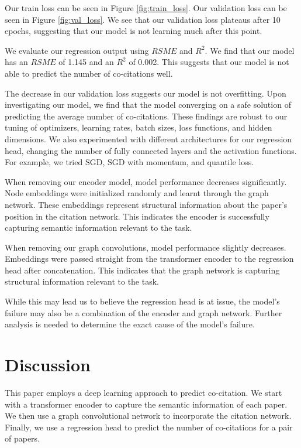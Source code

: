 \documentclass[10pt,twocolumn,letterpaper]{article}
\begin{document}
Our train loss can be seen in Figure \ref{fig:train_loss}. Our validation loss can be seen in Figure \ref{fig:val_loss}. We see that our validation loss plateaus after 10 epochs, suggesting that our model is not learning much after this point.

We evaluate our regression output using $RSME$ and $R^2$. We find that our model has an $RSME$ of 1.145 and an $R^2$ of 0.002. This suggests that our model is not able to predict the number of co-citations well. 

The decrease in our validation loss suggests our model is not overfitting. Upon investigating our model, we find that the model converging on a safe solution of predicting the average number of co-citations. These findings are robust to our tuning of optimizers, learning rates, batch sizes, loss functions, and hidden dimensions. We also experimented with different architectures for our regression head, changing the number of fully connected layers and the activation functions. For example, we tried SGD, SGD with momentum, and quantile loss.

When removing our encoder model, model performance decreases significantly. Node embeddings were initialized randomly and learnt through the graph network. These embeddings represent structural information about the paper's position in the citation network. This indicates the encoder is successfully capturing semantic information relevant to the task. 

When removing our graph convolutions, model performance slightly decreases. Embeddings were passed straight from the transformer encoder to the regression head after concatenation. This indicates that the graph network is capturing structural information relevant to the task. 

While this may lead us to believe the regression head is at issue, the model's failure may also be a combination of the encoder and graph network. Further analysis is needed to determine the exact cause of the model's failure.


\section{Discussion}

This paper employs a deep learning approach to predict co-citation. We start with a transformer encoder to capture the semantic information of each paper. We then use a graph convolutional network to incorporate the citation network. Finally, we use a regression head to predict the number of co-citations for a pair of papers. 
\end{document}
